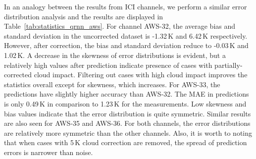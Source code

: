 \documentclass[amt]{copernicus}
\begin{document}
In an analogy between the results from ICI channels, we perform a similar error distribution analysis  and the results are displayed in Table~\ref{tab:statistics_qrnn_aws}. For channel AWS-32, the average bias and standard deviation in the uncorrected dataset is -1.32\,K and 6.42\,K respectively. However, after correction, the bias and standard deviation reduce to -0.03\,K and 1.02\,K. A decrease in the skewness of error distributions is evident, but a relatively high values after prediction indicate presence of cases with partially-corrected cloud impact. Filtering out cases with high cloud impact improves the statistics overall except for skewness, which increases.  For AWS-33, the predictions have slightly higher accuracy than AWS-32. The MAE in predictions is only 0.49\,K in comparison to 1.23\,K for the measurements. Low skewness and bias values indicate that the error distribution is quite symmetric. Similar results are also seen for AWS-35 and AWS-36. For both channels, the error distributions are relatively more symmetric than the other channels. Also, it is worth to noting that when cases with 5\,K cloud correction are removed, the spread of prediction errors is narrower than noise. 
\end{document}
